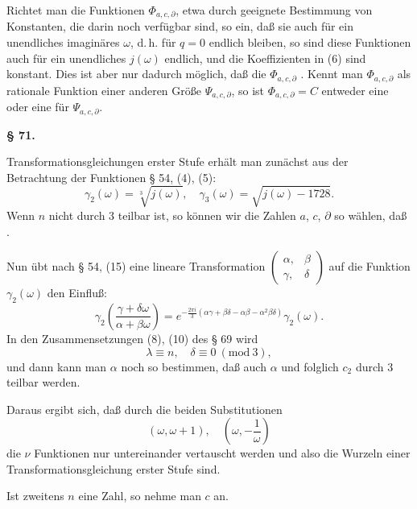 Richtet man die Funktionen $\Phi_{a,c,\partial}$, etwa durch
geeignete Bestimmung von Konstanten, die darin noch verfügbar sind,
so ein, daß sie auch für ein unendliches imaginäres $\omega$, d.\,h.
für $q=0$ endlich bleiben, so sind diese Funktionen auch für ein
unendliches $j(\omega)$ endlich, und die Koeffizienten in (6) sind
konstant. Dies ist aber nur dadurch möglich, daß die
$\Phi_{a,c,\partial}$ . Kennt man $\Phi_{a,c,\partial}$ als rationale Funktion einer
anderen Größe $\Psi_{a,c,\partial}$, so ist $\Phi_{a,c,\partial} = C$
entweder eine  oder eine  für
$\Psi_{a,c,\partial}$.

\begin{center}
\textbf{§ 71. }
\end{center}

Transformationsgleichungen erster Stufe erhält man zunächst aus der
Betrachtung der Funktionen § 54, (4), (5):
\[
\gamma_2(\omega) = \sqrt[3]{j(\omega)}, \quad \gamma_3(\omega) = \sqrt{j(\omega)-1728}.
\]
Wenn $n$ nicht durch 3 teilbar ist, so können wir die Zahlen $a$,
$c$, $\partial$ so wählen, daß .

Nun übt nach § 54, (15) eine lineare Transformation
$\begin{pmatrix} \alpha, & \beta \\ \gamma, & \delta \end{pmatrix}$
auf die Funktion $\gamma_2(\omega)$ den Einfluß:
\[
\gamma_2\left(\frac{\gamma+\delta\omega}{\alpha+\beta\omega}\right) = e^{-\frac{2\pi i}{3}(\alpha\gamma+\beta\delta-\alpha\beta-\alpha^2\beta\delta)} \gamma_2(\omega).
\]
In den Zusammensetzungen (8), (10) des § 69 wird
\[
\lambda \equiv n, \quad \delta \equiv 0 \ (\mathrm{mod}\ 3),
\]
und dann kann man $\alpha$ noch so bestimmen, daß auch $\alpha$ und
folglich $c_2$ durch 3 teilbar werden.

Daraus ergibt sich, daß durch die beiden Substitutionen
\[
(\omega, \omega+1), \quad \left(\omega, -\frac{1}{\omega}\right)
\]
die $\nu$ Funktionen
nur untereinander vertauscht werden und also die Wurzeln einer
Transformationsgleichung erster Stufe sind.

Ist zweitens $n$ eine  Zahl, so nehme man $c$
 an.
